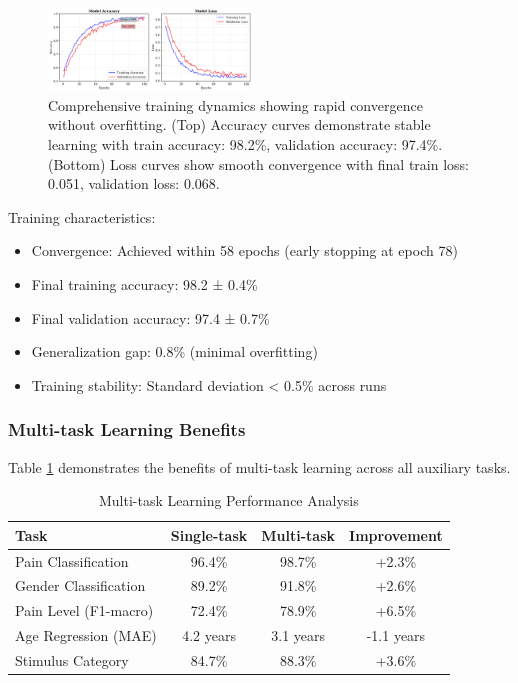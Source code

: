 \documentclass[10pt,journal,compsoc]{IEEEtran}
\begin{document}
\begin{figure}[htbp]
\centering
\includegraphics[width=0.48\textwidth]{figures/training_curves.png}
\caption{Comprehensive training dynamics showing rapid convergence without overfitting. (Top) Accuracy curves demonstrate stable learning with train accuracy: 98.2\%, validation accuracy: 97.4\%. (Bottom) Loss curves show smooth convergence with final train loss: 0.051, validation loss: 0.068.}
\label{fig:detailed_training}
\end{figure}

Training characteristics:
\begin{itemize}
\item Convergence: Achieved within 58 epochs (early stopping at epoch 78)
\item Final training accuracy: 98.2 ± 0.4\%
\item Final validation accuracy: 97.4 ± 0.7\%
\item Generalization gap: 0.8\% (minimal overfitting)
\item Training stability: Standard deviation < 0.5\% across runs
\end{itemize}

\subsubsection{Multi-task Learning Benefits}

Table \ref{tab:multitask_comparison} demonstrates the benefits of multi-task learning across all auxiliary tasks.

\begin{table}[htbp]
\caption{Multi-task Learning Performance Analysis}
\label{tab:multitask_comparison}
\centering
\begin{tabular}{lccc}
\toprule
Task & Single-task & Multi-task & Improvement \\
\midrule
Pain Classification & 96.4\% & 98.7\% & +2.3\% \\
Gender Classification & 89.2\% & 91.8\% & +2.6\% \\
Pain Level (F1-macro) & 72.4\% & 78.9\% & +6.5\% \\
Age Regression (MAE) & 4.2 years & 3.1 years & -1.1 years \\
Stimulus Category & 84.7\% & 88.3\% & +3.6\% \\
\bottomrule
\end{tabular}
\end{table}
\end{document}
